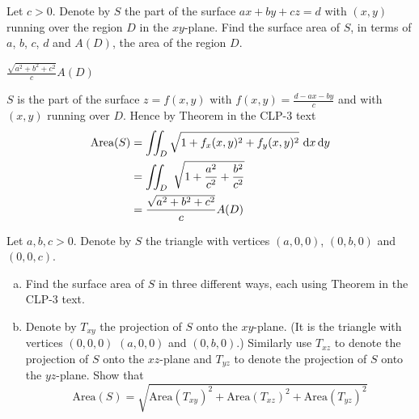 \begin{question}
Let $c > 0$. Denote by $S$ the part of 
the surface $ax+by+cz=d$ with $(x,y)$ running over the region $D$ in the $xy$-plane.
Find the surface area of $S$, in terms of $a$, $b$, $c$, $d$ and $A(D)$,
the area of the region $D$.
\end{question}


\begin{answer} 
$\frac{\sqrt{a^2+b^2+c^2}}{c} A(D)$
\end{answer}

\begin{solution}
 $S$ is the part of the surface $z=f(x,y)$ with $f(x,y) = \frac{d-ax-by}{c}$
and with $(x,y)$ running over $D$.
Hence by Theorem  in the CLP-3 text
\begin{align*}
\text{Area}(S)&=\dblInt_D \sqrt{1+f_x(x,y)^2+f_y(x,y)^2}\ \dee{x}\,\dee{y} \\
&=\dblInt_D\ \sqrt{1+\frac{a^2}{c^2}+\frac{b^2}{c^2}} \\
&=\frac{\sqrt{a^2+b^2+c^2}}{c} A(D)
\end{align*}

\end{solution}


\begin{question}
Let $a,b,c > 0$. Denote by $S$ the triangle with vertices $(a,0,0)$,
$(0,b,0)$ and $(0,0,c)$.
\begin{enumerate}[(a)]
\item
Find the surface area of $S$ in three different ways, each using 
Theorem  in the CLP-3 text.
\item
Denote by $T_{xy}$ the projection of $S$ onto the $xy$-plane. (It is the 
triangle with vertices $(0,0,0)$ $(a,0,0)$ and $(0,b,0)$.) Similarly use
$T_{xz}$ to denote the projection of $S$ onto the $xz$-plane and
$T_{yz}$ to denote the projection of $S$ onto the $yz$-plane. Show that
\begin{equation*}
\text{Area}(S) =\sqrt{\text{Area}(T_{xy})^2
                     +\text{Area}(T_{xz})^2
                     +\text{Area}(T_{yz})^2
                     }
\end{equation*}

\end{enumerate}
\end{question}

